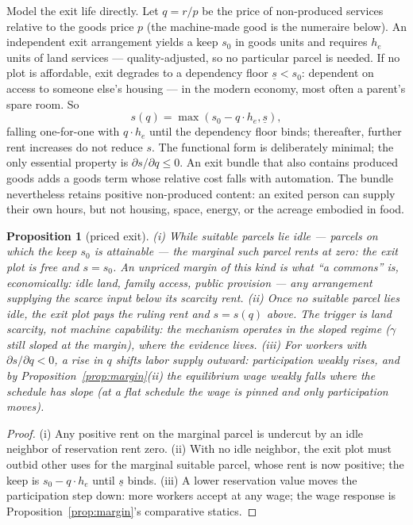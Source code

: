 \documentclass[12pt]{article}
\theoremstyle{plain}
\newtheorem{proposition}{Proposition}
\begin{document}
Model the exit life directly. Let $q = r/p$ be the price of non-produced services relative to the goods price $p$ (the machine-made good is the numeraire below). An independent exit arrangement yields a keep $s_0$ in goods units and requires $h_e$ units of land services --- quality-adjusted, so no particular parcel is needed. If no plot is affordable, exit degrades to a dependency floor $\underline{s} < s_0$: dependent on access to someone else's housing --- in the modern economy, most often a parent's spare room. So
\begin{equation}\label{eq:exit}
s(q) = \max( s_0 - q\cdot h_e , \underline{s} ),
\end{equation}
falling one-for-one with $q\cdot h_e$ until the dependency floor binds; thereafter, further rent increases do not reduce $s$. The functional form is deliberately minimal; the only essential property is $\partial s/\partial q \le 0$. An exit bundle that also contains produced goods adds a goods term whose relative cost falls with automation. The bundle nevertheless retains positive non-produced content: an exited person can supply their own hours, but not housing, space, energy, or the acreage embodied in food.

\begin{proposition}[priced exit]\label{prop:exit}
(i) While suitable parcels lie idle --- parcels on which the keep $s_0$ is attainable --- the marginal such parcel rents at zero: the exit plot is free and $s = s_0$. An unpriced margin of this kind is what ``a commons'' is, economically: idle land, family access, public provision --- any arrangement supplying the scarce input below its scarcity rent. (ii) Once no suitable parcel lies idle, the exit plot pays the ruling rent and $s = s(q)$ above. The trigger is land scarcity, not machine capability: the mechanism operates in the sloped regime ($\gamma$ still sloped at the margin), where the evidence lives. (iii) For workers with $\partial s/\partial q < 0$, a rise in $q$ shifts labor supply outward: participation weakly rises, and by Proposition~\ref{prop:margin}(ii) the equilibrium wage weakly falls where the schedule has slope (at a flat schedule the wage is pinned and only participation moves).
\end{proposition}

\begin{proof}
(i) Any positive rent on the marginal parcel is undercut by an idle neighbor of reservation rent zero. (ii) With no idle neighbor, the exit plot must outbid other uses for the marginal suitable parcel, whose rent is now positive; the keep is $s_0 - q\cdot h_e$ until $\underline{s}$ binds. (iii) A lower reservation value moves the participation step down: more workers accept at any wage; the wage response is Proposition~\ref{prop:margin}'s comparative statics.
\end{proof}
\end{document}
